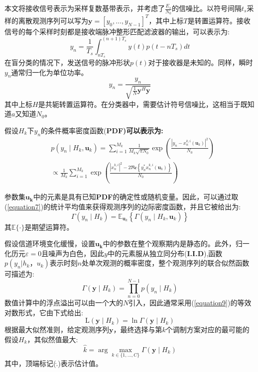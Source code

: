 \documentclass[final]{cvpr}
\begin{document}
本文将接收信号表示为采样复数基带表示，并考虑了$\frac{E_s}{N_0}$的信噪比。以符号间隔$t_s$采样的离散观测序列可以写为$\mathbf{y}=[y_0,\dots,y_{N−1}]^T$，其中上标$T$是转置运算符。接收信号的每个采样时刻都是接收端脉冲整形匹配滤波器的输出，可以表示为:
\begin{equation}
y_{n}=\frac{1}{T_{s}} \int_{n T_{s}}^{(n+1) T_{s}} y(t) p\left(t-n T_{s}\right) d t \label{equation5}
\end{equation}
在盲分类的情况下，发送信号的脉冲形状$p(t)$对于接收器是未知的。同样，瞬时$y_n$通常归一化为单位功率。
\begin{equation}
y_{n}=\frac{y_{n}}{\sqrt{\frac{1}{N} \mathbf{y}^{H} \mathbf{y}}}\label{equation6}
\end{equation}
其中上标$H$是共轭转置运算符。在分类器中，需要估计符号信噪比，这相当于既知道$a$又知道$N_0$。

假设$H_k$下$y_n$的条件概率密度函数(\bf PDF\rm)可以表示为:
\begin{equation}
\begin{aligned}
&p\left(y_{n} \mid H_{k}, \mathbf{u}_{k}\right) =\sum_{i=1}^{M_{k}} \frac{1}{M_{k} \sqrt{\pi N_{0}}} \exp \left(\frac{\left|y_{n}-x_{n}^{k, i}\left(\mathbf{u}_{k}\right)\right|^{2}}{N_{0}}\right) \\
& \propto \frac{1}{M_{k}} \sum_{i=1}^{M_{k}} \exp \left(\frac{\left|x_{n}^{k, i}\right|^{2}-2 \Re \mathfrak{e}\left\{y_{n}^{*} x_{n}^{k, i}\left(\mathbf{u}_{k}\right)\right\}}{N_{0}}\right)
\end{aligned}\label{equation7}
\end{equation}

参数集$\mathbf{u_k}$中的元素是具有已知\textbf{PDF}的确定性或随机变量。因此，可以通过取(\ref{equation7})的统计平均值来获得观测序列的边际密度函数，并且它被给出为:
\begin{equation}
\Gamma\left(y_{n} \mid H_{k}\right)=\mathbb{E}_{\mathbf{u}_{k}}\left\{\Gamma\left(y_{n} \mid H_{k}, \mathbf{u}_{k}\right)\right\}\label{equation8}
\end{equation}
其$\mathbb{E}\{·\}$是期望运算符。

假设信道环境变化缓慢，设置$\mathbf{u_k}$中的参数在整个观察期内是静态的。此外，归一化历元$\varepsilon=0$且噪声为白色，因此$y$中的元素服从独立同分布(\textbf{I.I.D}),函数$p(y_n|h_k，u_k)$表示时刻$n$处单次观测的概率密度，整个观测序列的联合似然函数可描述为:
\begin{equation}
\Gamma\left(\mathbf{y} \mid H_{k}\right)=\prod_{n=0}^{N-1} p\left(y_{n} \mid H_{k}\right)\label{equation9}
\end{equation}
数值计算中的浮点溢出可以由一个大的$N$引入，因此通常采用(\ref{equation9})的等效对数形式，它由下式给出:
\begin{equation}
\mathrm{L}\left(\mathbf{y} \mid H_{k}\right)=\ln \Gamma\left(\mathbf{y} \mid H_{k}\right)\label{equation10}
\end{equation}
根据最大似然准则，给定观测序列$\mathbf{y}$，最终选择与第$k$个调制方案对应的最可能的假设$H_k$，其似然值最大:
\begin{equation}
\widehat{k}=\arg \max _{k \in\{1, \ldots, C\}} \Gamma\left(\mathbf{y} \mid H_{k}\right)\label{equation11}
\end{equation}
其中，顶端标记($\widehat{.}$)表示估计值。
\end{document}
